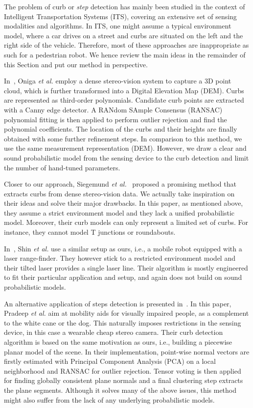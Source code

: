 The problem of curb or \emph{step} detection has mainly been studied in the
context of Intelligent Transportation Systems (ITS), covering an extensive set
of sensing modalities and algorithms. In ITS, one might assume a typical
environment model, where a car drives on a street and curbs are situated on the
left and the right side of the vehicle. Therefore, most of these approaches are
inappropriate as such for a pedestrian robot. We hence review the main ideas in
the remainder of this Section and put our method in perspective.

In~\cite{oniga10polynomial}, Oniga \emph{et al.} employ a dense stereo-vision
system to capture a 3D point cloud, which is further transformed into a Digital
Elevation Map (DEM). Curbs are represented as third-order polynomials. Candidate
curb points are extracted with a Canny edge detector. A RANdom SAmple Consensus
(RANSAC) polynomial fitting is then applied to perform outlier rejection and
find the polynomial coefficients. The location of the curbs and their heights
are finally obtained with some further refinement steps. In comparison to this
method, we use the same measurement representation (DEM). However, we draw a
clear and sound probabilistic model from the sensing device to the curb
detection and limit the number of hand-tuned parameters.

Closer to our approach, Siegemund \emph{et al.}~\cite{siegemund10curb} proposed
a promising method that extracts curbs from dense stereo-vision data. We
actually take inspiration on their ideas and solve their major drawbacks. In
this paper, as mentioned above, they assume a strict environment model and they
lack a unified probabilistic model. Moreover, their curb models can only
represent a limited set of curbs. For instance, they cannot model T
junctions or roundabouts.

In~\cite{shin10drivable}, Shin \emph{et al.} use a similar setup as ours, i.e.,
a mobile robot equipped with a laser range-finder. They however stick to a
restricted environment model and their tilted laser provides a single laser
line. Their algorithm is mostly engineered to fit their particular application
and setup, and again does not build on sound probabilistic models.

An alternative application of steps detection is presented
in~\cite{pradeep08piece}. In this paper, Pradeep \emph{et al.} aim at mobility
aids for visually impaired people, as a complement to the white cane or the dog.
This naturally imposes restrictions in the sensing device, in this case a
wearable cheap stereo camera. Their curb detection algorithm is based on the
same motivation as ours, i.e., building a piecewise planar model of the scene.
In their implementation, point-wise normal vectors are firstly estimated with
Principal Component Analysis (PCA) on a local neighborhood and RANSAC for
outlier rejection. Tensor voting is then applied for finding globally
consistent plane normals and a final clustering step extracts the plane
segments. Although it solves many of the above issues, this method might also
suffer from the lack of any underlying probabilistic models.

